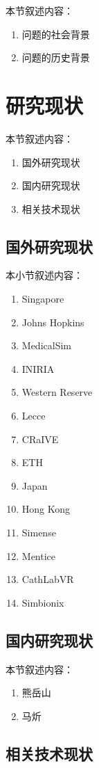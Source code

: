 本节叙述内容：
\begin{enumerate}
  \item 问题的社会背景
  \item 问题的历史背景
\end{enumerate}

\section{研究现状}

本节叙述内容：
\begin{enumerate}
  \item 国外研究现状
  \item 国内研究现状
  \item 相关技术现状
\end{enumerate}

\subsection{国外研究现状}

本小节叙述内容：
\begin{enumerate}
  \item Singapore
  \item Johns Hopkins
  \item MedicalSim
  \item INIRIA
  \item Western Reserve
  \item Lecce
  \item CRaIVE
  \item ETH
  \item Japan
  \item Hong Kong
  \item Simense
  \item Mentice
  \item CathLabVR
  \item Simbionix
\end{enumerate}

\subsection{国内研究现状}

本节叙述内容：
\begin{enumerate}
  \item 熊岳山
  \item 马炘
\end{enumerate}

\subsection{相关技术现状}

